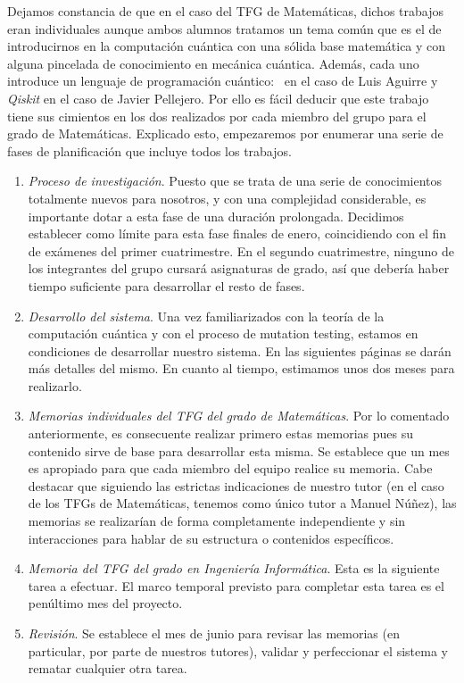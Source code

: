 Dejamos constancia de que en el caso del TFG de Matemáticas, dichos trabajos eran individuales aunque ambos alumnos tratamos un tema común que es el de introducirnos en la computación cuántica con una sólida base matemática y con alguna pincelada de conocimiento en mecánica cuántica. Además, cada uno introduce un lenguaje de programación cuántico: \qsh\ en el caso de Luis Aguirre y \textit{Qiskit} en el caso de Javier Pellejero.
%
Por ello es fácil deducir que este trabajo tiene sus cimientos en los dos realizados por cada miembro del grupo para el grado de Matemáticas. Explicado esto, empezaremos por enumerar una serie de fases de planificación que incluye todos los trabajos.

\begin{enumerate}
\item \textit{Proceso de investigación}. Puesto que se trata de una serie de conocimientos totalmente nuevos para nosotros, y con una complejidad considerable, es importante dotar a esta fase de una duración prolongada. Decidimos establecer como límite para esta fase finales de enero, coincidiendo con el fin de exámenes del primer cuatrimestre. En el segundo cuatrimestre, ninguno de los integrantes del grupo cursará asignaturas de grado, así que debería haber tiempo suficiente para desarrollar el resto de fases.
\item \textit{Desarrollo del sistema}. Una vez familiarizados con la teoría de la computación cuántica y con el proceso de mutation testing, estamos en condiciones de desarrollar nuestro sistema. En las siguientes páginas se darán más detalles del mismo. En cuanto al tiempo, estimamos unos dos meses para realizarlo.
\item \textit{Memorias individuales del TFG del grado de Matemáticas}. Por lo comentado anteriormente, es consecuente realizar primero estas memorias pues su contenido sirve de base para desarrollar esta misma. Se establece que un mes es apropiado para que cada miembro del equipo realice su memoria. Cabe destacar que siguiendo las estrictas indicaciones de nuestro tutor (en el caso de los TFGs de Matemáticas, tenemos como único tutor a Manuel Núñez), las memorias se realizarían de forma completamente independiente y sin interacciones para hablar de su estructura o contenidos específicos.
\item \textit{Memoria del TFG del grado en Ingeniería Informática}. Esta es la siguiente tarea a efectuar. El marco temporal previsto para completar esta tarea es el penúltimo mes del proyecto.
\item \textit{Revisión}. Se establece el mes de junio para revisar las memorias (en particular, por parte de nuestros tutores), validar y perfeccionar el sistema y rematar cualquier otra tarea.
\end{enumerate}

